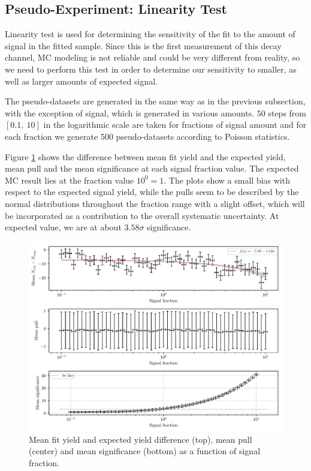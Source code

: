 \subsection{Pseudo-Experiment: Linearity Test}
\label{sec:pseudo-experiment-linearity-test}
Linearity test is used for determining the sensitivity of the fit to the amount of signal in the fitted sample. Since this is the first measurement of this decay channel, MC modeling is not reliable and could be very different from reality, so we need to perform this test in order to determine our sensitivity to smaller, as well as larger amounts of expected signal.

The pseudo-datasets are generated in the same way as in the previous subsection, with the exception of signal, which is generated in various amounts. $50$ steps from $[0.1,~10]$ in the logarithmic scale are taken for fractions of signal amount and for each fraction we generate 500 pseudo-datasets according to Poisson statistics.

Figure \ref{fig:lin_test} shows the difference between mean fit yield and the expected yield, mean pull and the mean significance at each signal fraction value. The expected MC result lies at the fraction value $10^0 = 1$. The plots show a small bias with respect to the expected signal yield, while the pulls seem to be described by the normal distributions throughout the fraction range with a slight offset, which will be incorporated as a contribution to the overall systematic uncertainty. At expected value, we are at about $3.58\sigma$ significance.

\begin{figure}[H]
	\centering
	\captionsetup{width=0.8\linewidth}
	\includegraphics[width=\linewidth]{fig/lin_test}
	\caption{Mean fit yield and expected yield difference (top), mean pull (center) and mean significance (bottom) as a function of signal fraction.}
	\label{fig:lin_test}
\end{figure}


